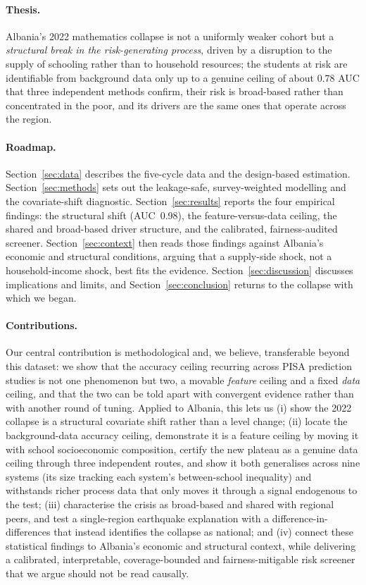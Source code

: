 \paragraph{Thesis.}
Albania's 2022 mathematics collapse is not a uniformly weaker cohort but a
\emph{structural break in the risk-generating process}, driven by a disruption to the
supply of schooling rather than to household resources; the students at risk are
identifiable from background data only up to a genuine ceiling of about 0.78 AUC that
three independent methods confirm, their risk is broad-based rather than concentrated
in the poor, and its drivers are the same ones that operate across the region.

\paragraph{Roadmap.}
Section~\ref{sec:data} describes the five-cycle data and the design-based estimation.
Section~\ref{sec:methods} sets out the leakage-safe, survey-weighted modelling and the
covariate-shift diagnostic. Section~\ref{sec:results} reports the four empirical
findings: the structural shift (AUC~0.98), the feature-versus-data ceiling, the shared
and broad-based driver structure, and the calibrated, fairness-audited screener.
Section~\ref{sec:context} then reads those findings against Albania's economic and
structural conditions, arguing that a supply-side shock, not a household-income shock,
best fits the evidence. Section~\ref{sec:discussion} discusses implications and limits,
and Section~\ref{sec:conclusion} returns to the collapse with which we began.

\paragraph{Contributions.}
Our central contribution is methodological and, we believe, transferable beyond this
dataset: we show that the accuracy ceiling recurring across PISA prediction studies is
not one phenomenon but two, a movable \emph{feature} ceiling and a fixed \emph{data}
ceiling, and that the two can be told apart with convergent evidence rather than with
another round of tuning. Applied to Albania, this lets us (i) show the 2022 collapse is
a structural covariate shift rather than a level change; (ii) locate the background-data
accuracy ceiling, demonstrate it is a feature ceiling by moving it with school
socioeconomic composition, certify the new plateau as a genuine data ceiling through
three independent routes, and show it both generalises across nine systems (its size
tracking each system's between-school inequality) and withstands richer process data
that only moves it through a signal endogenous to the test; (iii) characterise the
crisis as broad-based and shared with regional peers, and test a single-region
earthquake explanation with a difference-in-differences that instead identifies the
collapse as national; and (iv) connect these statistical findings to Albania's economic
and structural context, while delivering a calibrated, interpretable, coverage-bounded
and fairness-mitigable risk screener that we argue should not be read causally.
